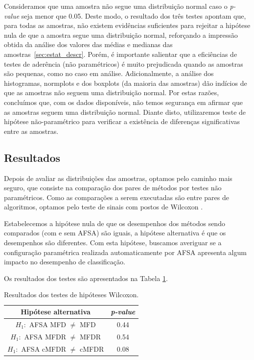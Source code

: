 \documentclass[conference]{IEEEtran}
\begin{document}
Consideramos que uma amostra não segue uma distribuição normal caso o \textit{p-value} seja menor que 0.05.
Deste modo, o resultado dos três testes apontam que, para todas as amostras, não existem evidências suficientes para rejeitar a hipótese nula de que a amostra segue uma distribuição normal, reforçando a impressão obtida da análise dos valores das médias e medianas das amostras~\ref{sec:estat_descr}.
Porém, é importante salientar que a eficiências de testes de aderência (não paramétricos) é muito prejudicada quando as amostras são pequenas, como no caso em análise.
Adicionalmente, a análise dos histogramas, normplots e dos boxplots (da maioria das amostras) dão indícios de que as amostras não seguem uma distribuição normal.
Por estas razões, concluímos que, com os dados disponíveis, não temos segurança em afirmar que as amostras seguem uma distribuição normal.
Diante disto, utilizaremos teste de hipótese não-paramétrico para verificar a existência de diferenças significativas entre as amostras.

\subsection{Resultados}

Depois de avaliar as distribuições das amostras, optamos pelo caminho mais seguro, que consiste na comparação dos pares de métodos por testes não paramétricos. 
Como as comparações a serem executadas são entre pares de algoritmos, optamos pelo teste de sinais com postos de Wilcoxon \cite{wilcoxon1945individual}.

Estabelecemos a hipótese nula de que os desempenhos dos métodos sendo comparados (com e sem AFSA) são iguais, a hipótese alternativa é que os desempenhos são diferentes. Com esta hipótese, buscamos averiguar se a configuração paramétrica realizada automaticamente por AFSA apresenta algum impacto no desempenho de classificação.

Os resultados dos testes são apresentados na Tabela 
\ref{tab:rank_sum}.

\begin{table}[h]
	\centering
	\caption{Resultados dos testes de hipóteses Wilcoxon.}
	\label{tab:rank_sum}
	\begin{tabular}{c|c}
		\hline
		Hipótese alternativa					& \textit{p-value}\\
		\hline
		$H_1:$ AFSA MFD $\neq$ MFD   			& 0.44    \\
		$H_1:$ AFSA MFDR  $\neq$ MFDR			& 0.54    \\
		$H_1:$ AFSA cMFDR $\neq$ cMFDR			& 0.08    \\
		\hline
	\end{tabular}
\end{table}
\end{document}
